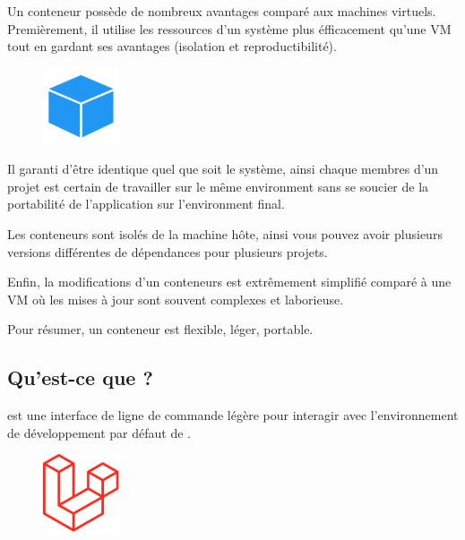    Un conteneur \docker{} possède de nombreux avantages comparé aux machines virtuels. Premièrement, il utilise les ressources d'un système plus éfficacement qu'une VM tout en gardant ses avantages (isolation et reproductibilité). 

    \begin{figure}
        \centering
        \includegraphics[width=0.2\textwidth]{Images_formation/Iconconteneur.pdf}
    \end{figure}

    Il garanti d'être identique quel que soit le système, ainsi chaque membres d'un projet est certain de travailler sur le même environment sans se soucier de la portabilité de l'application sur l'environment final.
    
    Les conteneurs sont isolés de la machine hôte, ainsi vous pouvez avoir plusieurs versions différentes de dépendances pour plusieurs projets.

    Enfin, la modifications d'un conteneurs est extrêmement simplifié comparé à une VM où les mises à jour sont souvent complexes et laborieuse.

    Pour résumer, un conteneur \docker{} est flexible, léger, portable.

\subsection[Qu'est-ce que Laravel Sail?]{Qu'est-ce que \laravelsail{}?}
    
    \laravelsail{} est une interface de ligne de commande légère pour interagir avec l'environnement de développement \docker{} par défaut de \laravel{}. 
    
    \begin{figure}
        \centering
        \includegraphics[width=0.2\textwidth]{Images_formation/LaravelLogo.pdf}
    \end{figure}
    
